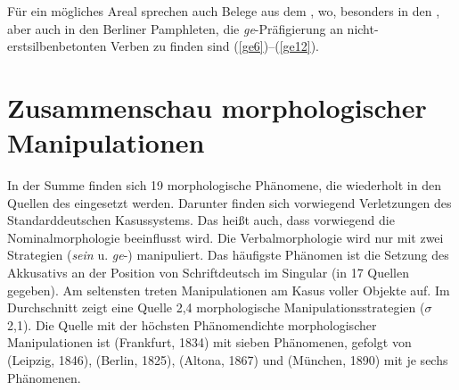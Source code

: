 Für ein mögliches Areal sprechen auch Belege aus dem , wo, besonders in den , aber auch in den Berliner Pamphleten, die {\textit{ge}}-Präfigierung an nicht-erstsilbenbetonten Verben zu finden sind (\ref{ge6})--(\ref{ge12}). 

    
      \section{Zusammenschau morphologischer Manipulationen}\label{fazitmorph}
In der Summe finden sich 19 morphologische Phänomene, die wiederholt in den Quellen des  eingesetzt werden. Darunter finden sich vorwiegend Verletzungen des Standarddeutschen Kasussystems. Das heißt auch, dass vorwiegend die Nominalmorphologie beeinflusst wird. Die Verbalmorphologie wird nur mit zwei Strategien (\textit{sein}  u. \textit{ge}-) manipuliert. Das häufigste Phänomen ist die Setzung des Akkusativs an der Position von Schriftdeutsch  im Singular (in 17 Quellen gegeben). Am seltensten treten Manipulationen am Kasus voller Objekte auf. Im Durchschnitt zeigt eine Quelle 2,4 morphologische Manipulationsstrategien ({$\sigma$}\,2,1). Die Quelle mit der höchsten Phänomendichte morphologischer Manipulationen ist  (Frankfurt, 1834) mit sieben Phänomenen, gefolgt von  (Leipzig, 1846),  (Berlin, 1825),  (Altona, 1867) und  (München, 1890) mit je sechs Phänomenen.

